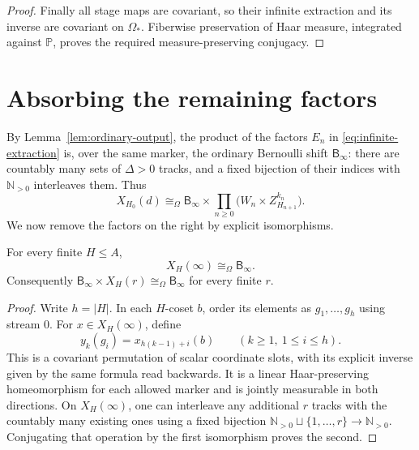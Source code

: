 \documentclass[11pt,a4paper]{article}
\numberwithin{equation}{section}
\newcommand{\NN}{\mathbb N}
\newcommand{\Prob}{\mathbb P}
\newcommand{\reliso}{\mathrel{\cong_{\Omega}}}
\newcommand{\Binf}{\mathsf B_\infty}
\begin{document}
\begin{proof}
Finally all stage maps are covariant, so their infinite extraction and
its inverse are covariant on $\Omega_*$. Fiberwise preservation of
Haar measure, integrated against $\Prob$, proves the required
measure-preserving conjugacy.
\end{proof}

\section{Absorbing the remaining factors}\label{sec:absorption}

By Lemma~\ref{lem:ordinary-output}, the product of the factors $E_n$
in \eqref{eq:infinite-extraction} is, over the same marker, the ordinary
Bernoulli shift $\Binf$: there are countably many sets of $\Delta>0$
tracks, and a fixed bijection of their indices with $\NN_{>0}$
interleaves them. Thus
\begin{equation}\label{eq:with-residuals}
 X_{H_0}(d)\reliso
 \Binf\times\prod_{n\geq0}
       \bigl(W_n\times Z_{H_{n+1}}^{k_n}\bigr).
\end{equation}
We now remove the factors on the right by explicit isomorphisms.

\begin{lemma}\label{lem:interleave}
For every finite $H\leq A$,
\[
 X_H(\infty)\reliso\Binf.
\]
Consequently $\Binf\times X_H(r)\reliso\Binf$ for every finite $r$.
\end{lemma}
\begin{proof}
Write $h=|H|$. In each $H$-coset $b$, order its elements as
$g_1,\ldots,g_h$ using stream $0$. For $x\in X_H(\infty)$, define
\[
 y_k(g_i)=x_{h(k-1)+i}(b)
 \qquad(k\geq1,\ 1\leq i\leq h).
\]
This is a covariant permutation of scalar coordinate slots, with its
explicit inverse given by the same formula read backwards. It is a
linear Haar-preserving homeomorphism for each allowed marker and is
jointly measurable in both directions. On $X_H(\infty)$, one can
interleave any additional $r$ tracks with the countably many existing
ones using a fixed bijection $\NN_{>0}\sqcup\{1,\ldots,r\}\to\NN_{>0}$.
Conjugating that operation by the first isomorphism proves the second.
\end{proof}
\end{document}
